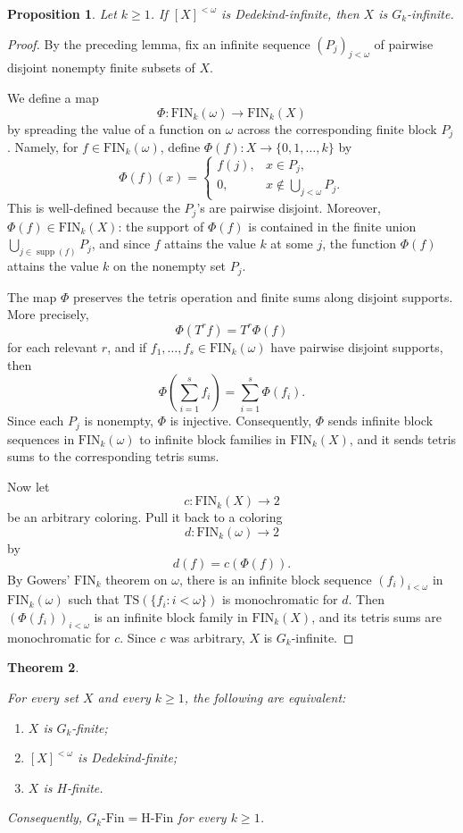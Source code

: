 \documentclass[10pt,a4paper]{amsart}
\newtheorem{theorem}{Theorem}[section]
\newtheorem{proposition}[theorem]{Proposition}
\theoremstyle{definition}
\DeclareMathOperator{\supp}{supp}
\newcommand{\Fin}{\mathrm{Fin}}
\newcommand{\HFin}{\mathrm{H\text{-}Fin}}
\newcommand{\FIN}{\mathrm{FIN}}
\newcommand{\TS}{\mathrm{TS}}
\begin{document}
\begin{proposition}
Let \(k\geq 1\).  If \([X]^{<\omega}\) is Dedekind-infinite, then \(X\) is \(G_k\)-infinite.
\end{proposition}

\begin{proof}
By the preceding lemma, fix an infinite sequence \((P_j)_{j<\omega}\) of pairwise disjoint nonempty finite subsets of \(X\).

We define a map
\[
    \Phi:\FIN_k(\omega)\to \FIN_k(X)
\]
by spreading the value of a function on \(\omega\) across the corresponding finite block \(P_j\).  Namely, for \(f\in\FIN_k(\omega)\), define \(\Phi(f):X\to\{0,1,\dots,k\}\) by
\[
    \Phi(f)(x)=
    \begin{cases}
        f(j), & x\in P_j,\\
        0, & x\notin \bigcup_{j<\omega}P_j.
    \end{cases}
\]
This is well-defined because the \(P_j\)'s are pairwise disjoint.  Moreover, \(\Phi(f)\in\FIN_k(X)\): the support of \(\Phi(f)\) is contained in the finite union \(\bigcup_{j\in \supp(f)}P_j\), and since \(f\) attains the value \(k\) at some \(j\), the function \(\Phi(f)\) attains the value \(k\) on the nonempty set \(P_j\).

The map \(\Phi\) preserves the tetris operation and finite sums along disjoint supports.  More precisely,
\[
    \Phi(T^r f)=T^r\Phi(f)
\]
for each relevant \(r\), and if \(f_1,\dots,f_s\in\FIN_k(\omega)\) have pairwise disjoint supports, then
\[
    \Phi\left(\sum_{i=1}^s f_i\right)=\sum_{i=1}^s \Phi(f_i).
\]
Since each \(P_j\) is nonempty, \(\Phi\) is injective.  Consequently, \(\Phi\) sends infinite block sequences in \(\FIN_k(\omega)\) to infinite block families in \(\FIN_k(X)\), and it sends tetris sums to the corresponding tetris sums.

Now let
\[
    c:\FIN_k(X)\to 2
\]
be an arbitrary coloring.  Pull it back to a coloring
\[
    d:\FIN_k(\omega)\to 2
\]
by
\[
    d(f)=c(\Phi(f)).
\]
By Gowers' \(\FIN_k\) theorem on \(\omega\), there is an infinite block sequence \((f_i)_{i<\omega}\) in \(\FIN_k(\omega)\) such that \(\TS(\{f_i:i<\omega\})\) is monochromatic for \(d\).  Then \((\Phi(f_i))_{i<\omega}\) is an infinite block family in \(\FIN_k(X)\), and its tetris sums are monochromatic for \(c\).  Since \(c\) was arbitrary, \(X\) is \(G_k\)-infinite.
\end{proof}

\begin{theorem}\label{thm:gowers-collapse}
\begin{samepage}
For every set \(X\) and every \(k\geq 1\), the following are equivalent:
\begin{enumerate}[label=(\arabic*)]
    \item \(X\) is \(G_k\)-finite;
    \item \([X]^{<\omega}\) is Dedekind-finite;
    \item \(X\) is \(H\)-finite.
\end{enumerate}
\end{samepage}
Consequently, \(G_k\text{-}\Fin=\HFin\) for every \(k\geq 1\).
\end{theorem}
\end{document}
